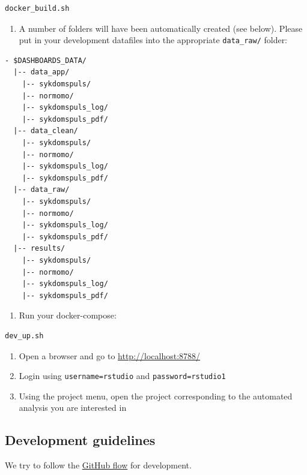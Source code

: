 \documentclass[12pt,]{article}
\providecommand{\tightlist}{%
  \setlength{\itemsep}{0pt}\setlength{\parskip}{0pt}}
\begin{document}
\begin{verbatim}
docker_build.sh
\end{verbatim}

\begin{enumerate}
\def\labelenumi{\arabic{enumi}.}
\setcounter{enumi}{8}
\tightlist
\item
  A number of folders will have been automatically created (see below).
  Please put in your development datafiles into the appropriate
  \texttt{data\_raw/} folder:
\end{enumerate}

\begin{verbatim}
- $DASHBOARDS_DATA/
  |-- data_app/
    |-- sykdomspuls/
    |-- normomo/
    |-- sykdomspuls_log/
    |-- sykdomspuls_pdf/
  |-- data_clean/
    |-- sykdomspuls/
    |-- normomo/
    |-- sykdomspuls_log/
    |-- sykdomspuls_pdf/
  |-- data_raw/
    |-- sykdomspuls/
    |-- normomo/
    |-- sykdomspuls_log/
    |-- sykdomspuls_pdf/
  |-- results/
    |-- sykdomspuls/
    |-- normomo/
    |-- sykdomspuls_log/
    |-- sykdomspuls_pdf/
\end{verbatim}

\begin{enumerate}
\def\labelenumi{\arabic{enumi}.}
\setcounter{enumi}{9}
\tightlist
\item
  Run your docker-compose:
\end{enumerate}

\begin{verbatim}
dev_up.sh
\end{verbatim}

\begin{enumerate}
\def\labelenumi{\arabic{enumi}.}
\setcounter{enumi}{10}
\tightlist
\item
  Open a browser and go to \url{http://localhost:8788/}
\item
  Login using \texttt{username=rstudio} and \texttt{password=rstudio1}
\item
  Using the project menu, open the project corresponding to the
  automated analysis you are interested in
\end{enumerate}

\subsection{Development guidelines}\label{development-guidelines}

We try to follow the
\href{https://guides.github.com/introduction/flow/}{GitHub flow} for
development.
\end{document}
